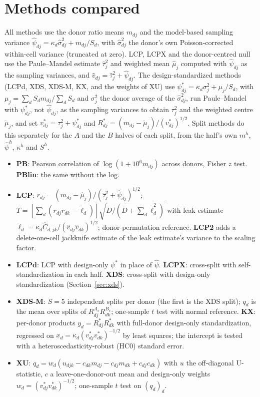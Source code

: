 \section{Methods compared}\label{app:methods}

All methods use the donor ratio means $m_{dj}$ and the model-based sampling variance $\hat\psi_{dj}=\kappa_d\hat\sigma^2_{dj}+m_{dj}/S_d$, with $\hat\sigma^2_{dj}$ the donor's own Poisson-corrected within-cell variance (truncated at zero). LCP, LCPX and the donor-centred null use the Paule--Mandel estimate $\hat\tau^2_j$ and weighted mean $\hat\mu_j$ computed with $\hat\psi_{dj}$ as the sampling variances, and $\hat v_{dj}=\hat\tau^2_j+\hat\psi_{dj}$. The design-standardized methods (LCPd, XDS, XDS-M, KX, and the weights of XU) use $\psi^*_{dj}=\kappa_d\sigma^2_j+\mu_j/S_d$, with $\mu_j=\sum_dS_dm_{dj}/\sum_dS_d$ and $\sigma^2_j$ the donor average of the $\hat\sigma^2_{dj}$, run Paule--Mandel with $\psi^*_{dj}$, not $\hat\psi_{dj}$, as the sampling variances to obtain $\tau^2_j$ and the weighted centre $\tilde\mu_j$, and set $v^*_{dj}=\tau^2_j+\psi^*_{dj}$ and $R^*_{dj}=(m_{dj}-\tilde\mu_j)/(v^*_{dj})^{1/2}$. Split methods do this separately for the $A$ and the $B$ halves of each split, from the half's own $m^h$, $\hat\psi^h$, $\kappa^h$ and $S^h$.
\begin{itemize}\itemsep0pt
\item \textbf{PB}: Pearson correlation of $\log(1+10^6m_{dj})$ across donors, Fisher $z$ test. \textbf{PBlin}: the same without the log.
\item \textbf{LCP}: $r_{dj}=(m_{dj}-\hat\mu_j)/(\hat\tau_j^2+\hat\psi_{dj})^{1/2}$; $T=[\sum_d(r_{dj}r_{dk}-\tilde\ell_d)]\sqrt{D/(D+\sum_d\tilde\ell_d^2)}$ with leak estimate $\tilde\ell_d=\kappa_d\hat C_{d,jk}/(\hat v_{dj}\hat v_{dk})^{1/2}$; donor-permutation reference. \textbf{LCP2} adds a delete-one-cell jackknife estimate of the leak estimate's variance to the scaling factor.
\item \textbf{LCPd}: LCP with design-only $\psi^*$ in place of $\hat\psi$. \textbf{LCPX}: cross-split with self-standardization in each half. \textbf{XDS}: cross-split with design-only standardization (Section~\ref{sec:xds}).
\item \textbf{XDS-M}: $S=5$ independent splits per donor (the first is the XDS split); $q_d$ is the mean over splits of $R^{A_s}_{dj}R^{B_s}_{dk}$; one-sample $t$ test with normal reference. \textbf{KX}: per-donor products $y_d=R^*_{dj}R^*_{dk}$ with full-donor design-only standardization, regressed on $x_d=\kappa_d(v^*_{dj}v^*_{dk})^{-1/2}$ by least squares; the intercept is tested with a heteroscedasticity-robust (HC0) standard error.
\item \textbf{XU}: $q_d=w_d(u_{djk}-c_{dk}m_{dj}-c_{dj}m_{dk}+c_{dj}c_{dk})$ with $u$ the off-diagonal U-statistic, $c$ a leave-one-donor-out mean and design-only weights $w_d=(v^*_{dj}v^*_{dk})^{-1/2}$; one-sample $t$ test on $(q_d)_d$.
\end{itemize}

